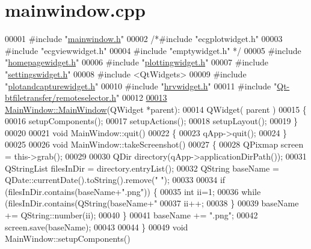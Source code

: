 \hypertarget{mainwindow_8cpp_source}{}\section{mainwindow.\+cpp}
\label{mainwindow_8cpp_source}

\begin{DoxyCode}
00001 \textcolor{preprocessor}{#include "\hyperlink{mainwindow_8h}{mainwindow.h}"}
00002 \textcolor{comment}{/*#include "ecgplotwidget.h"}
00003 \textcolor{comment}{#include "ecgviewwidget.h"}
00004 \textcolor{comment}{#include "emptywidget.h" */}
00005 \textcolor{preprocessor}{#include "\hyperlink{homepagewidget_8h}{homepagewidget.h}"}
00006 \textcolor{preprocessor}{#include "\hyperlink{plottingwidget_8h}{plottingwidget.h}"}
00007 \textcolor{preprocessor}{#include "\hyperlink{settingswidget_8h}{settingswidget.h}"}
00008 \textcolor{preprocessor}{#include <QtWidgets>}
00009 \textcolor{preprocessor}{#include "\hyperlink{plotandcapturewidget_8h}{plotandcapturewidget.h}"}
00010 \textcolor{preprocessor}{#include "\hyperlink{hrvwidget_8h}{hrvwidget.h}"}
00011 \textcolor{preprocessor}{#include "\hyperlink{remoteselector_8h}{Qt-btfiletransfer/remoteselector.h}"}
00012 
\hypertarget{mainwindow_8cpp_source.tex_l00013}{}\hyperlink{classMainWindow_a25e1fb1c2c42a5b961db39ae08ff6443}{00013} \hyperlink{classMainWindow_a25e1fb1c2c42a5b961db39ae08ff6443}{MainWindow::MainWindow}(QWidget *parent):
00014     QWidget( parent )
00015 \{
00016     setupComponents();
00017     setupActions();
00018     setupLayout();
00019 \}
00020 
00021 \textcolor{keywordtype}{void} MainWindow::quit()
00022 \{
00023     qApp->quit();
00024 \}
00025 
00026 \textcolor{keywordtype}{void} MainWindow::takeScreenshot()
00027 \{
00028     QPixmap screen = this->grab();
00029 
00030     QDir directory(qApp->applicationDirPath());
00031     QStringList filesInDir = directory.entryList();
00032     QString baseName = QDate::currentDate().toString().remove(\textcolor{stringliteral}{" "});
00033 
00034     \textcolor{keywordflow}{if} (filesInDir.contains(baseName+\textcolor{stringliteral}{".png"})) \{
00035         \textcolor{keywordtype}{int} ii=1;
00036         \textcolor{keywordflow}{while} (filesInDir.contains(QString(baseName+\textcolor{stringliteral}{"%
00037             ii++;
00038         \}
00039         baseName += QString::number(ii);
00040     \}
00041     baseName += \textcolor{stringliteral}{".png"};
00042     screen.save(baseName);
00043 
00044 \}
00049 \textcolor{keywordtype}{void} MainWindow::setupComponents()
}
\end{DoxyCode}
